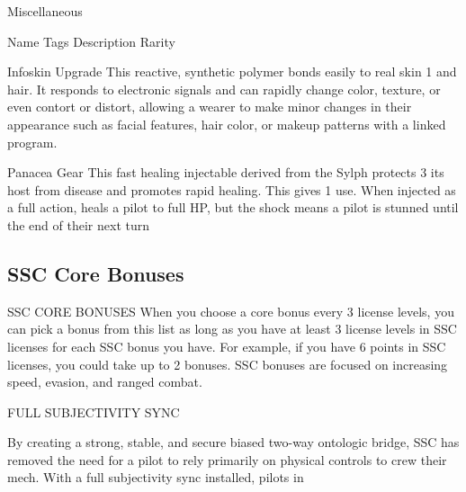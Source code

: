                                                        Miscellaneous  

  Name           Tags            Description                                                              Rarity 

                                                                                                                           


Infoskin        Upgrade        This reactive, synthetic polymer bonds easily to real skin               1 
                                and hair. It responds to electronic signals and can rapidly  
                                change color, texture, or even contort or distort, allowing a  
                               wearer to make minor changes in their appearance such as  
                               facial features, hair color, or makeup patterns with a linked  
                                program. 

Panacea         Gear           This fast healing injectable derived from the Sylph protects             3 
                                its host from disease and promotes rapid healing. This  
                                gives 1 use. When injected as a full action, heals a pilot to  
                               full HP, but the shock means a pilot is stunned until the end  
                                of their next turn 

                                                                                                                         
\subsection{SSC Core Bonuses}

                                         SSC CORE BONUSES  
When you choose a core bonus every 3 license levels, you can pick a bonus from this list as long  
as you have at least 3 license levels in SSC licenses for each SSC bonus you have. For example,  
if you have 6 points in SSC licenses, you could take up to 2 bonuses. SSC bonuses are focused  
on increasing speed, evasion, and ranged combat.
 

FULL SUBJECTIVITY SYNC  

By creating a strong, stable, and secure biased two-way ontologic bridge, SSC has removed the need for a  
pilot to rely primarily on physical controls to crew their mech. With a full subjectivity sync installed, pilots in  


